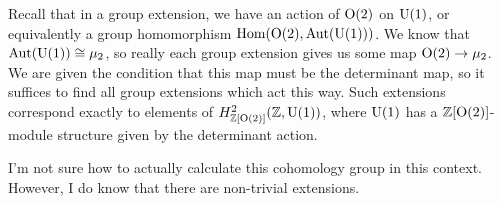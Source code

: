 \documentclass{pset}
\begin{document}
\begin{parts}
  Recall that in a group extension, we have an action of $\mathrm{O}(2)$ on $\mathrm{U}(1)$, or equivalently a group homomorphism $\textrm{Hom}(\mathrm{O}(2), \textrm{Aut}(\mathrm{U}(1)))$. We know that $\textrm{Aut}(\mathrm{U}(1))\cong \mu_2$, so really each group extension gives us some map $\mathrm{O}(2) \to \mu_2$. We are given the condition that this map must be the determinant map, so it suffices to find all group extensions which act this way. Such extensions correspond exactly to elements of $H^2_{\mathbb{Z}[\mathrm{O}(2)]}(\mathbb{Z}, \mathrm{U}(1))$, where $\mathrm{U}(1)$ has a $\mathbb{Z}[\mathrm{O}(2)]$-module structure given by the determinant action. 

  I'm not sure how to actually calculate this cohomology group in this context. However, I do know that there are non-trivial extensions.
\end{parts}
\end{document}
